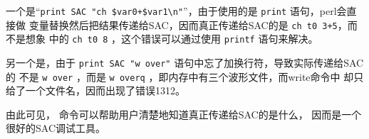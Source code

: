 一个是``\verb|print SAC "ch $var0+$var1\n"|''，由于使用的是 \texttt{print} 语句，perl会直接做
变量替换然后把结果传递给SAC，因而真正传递给SAC的是 \texttt{ch t0 3+5}，而不是想象
中的 \texttt{ch t0 8} ，这个错误可以通过使用 \texttt{printf} 语句来解决。

另一个是，由于 \texttt{print SAC "w over"} 语句中忘了加换行符，导致实际传递给SAC的
不是 \texttt{w over} ，而是 \texttt{w overq} ，即内存中有三个波形文件，而write命令中
却只给了一个文件名，因而出现了错误1312。

由此可见， 命令可以帮助用户清楚地知道真正传递给SAC的是什么，
因而是一个很好的SAC调试工具。